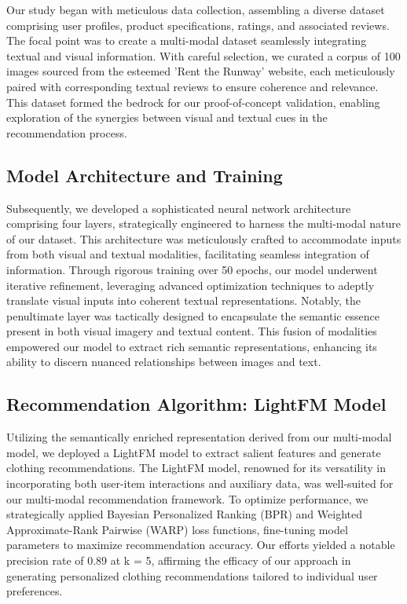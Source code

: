 \documentclass[conference]{IEEEtran}
\begin{document}
Our study began with meticulous data collection, assembling a diverse dataset comprising user profiles, product specifications, ratings, and associated reviews. The focal point was to create a multi-modal dataset seamlessly integrating textual and visual information. With careful selection, we curated a corpus of 100 images sourced from the esteemed 'Rent the Runway' website, each meticulously paired with corresponding textual reviews to ensure coherence and relevance. This dataset formed the bedrock for our proof-of-concept validation, enabling exploration of the synergies between visual and textual cues in the recommendation process.

\subsection{Model Architecture and Training}

Subsequently, we developed a sophisticated neural network architecture comprising four layers, strategically engineered to harness the multi-modal nature of our dataset. This architecture was meticulously crafted to accommodate inputs from both visual and textual modalities, facilitating seamless integration of information. Through rigorous training over 50 epochs, our model underwent iterative refinement, leveraging advanced optimization techniques to adeptly translate visual inputs into coherent textual representations. Notably, the penultimate layer was tactically designed to encapsulate the semantic essence present in both visual imagery and textual content. This fusion of modalities empowered our model to extract rich semantic representations, enhancing its ability to discern nuanced relationships between images and text.

\subsection{Recommendation Algorithm: LightFM Model}

Utilizing the semantically enriched representation derived from our multi-modal model, we deployed a LightFM model to extract salient features and generate clothing recommendations. The LightFM model, renowned for its versatility in incorporating both user-item interactions and auxiliary data, was well-suited for our multi-modal recommendation framework. To optimize performance, we strategically applied Bayesian Personalized Ranking (BPR) and Weighted Approximate-Rank Pairwise (WARP) loss functions, fine-tuning model parameters to maximize recommendation accuracy. Our efforts yielded a notable precision rate of 0.89 at k = 5, affirming the efficacy of our approach in generating personalized clothing recommendations tailored to individual user preferences.
\end{document}
